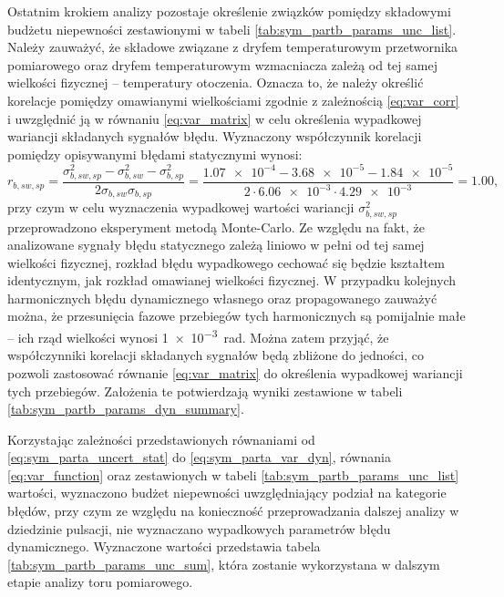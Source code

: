 Ostatnim krokiem analizy pozostaje określenie związków pomiędzy składowymi budżetu niepewności zestawionymi w tabeli \ref{tab:sym_partb_params_unc_list}. Należy zauważyć, że składowe związane z dryfem temperaturowym przetwornika pomiarowego oraz dryfem temperaturowym wzmacniacza zależą od tej samej wielkości fizycznej -- temperatury otoczenia. Oznacza to, że należy określić korelacje pomiędzy omawianymi wielkościami zgodnie z zależnością \eqref{eq:var_corr} i uwzględnić ją w równaniu \eqref{eq:var_matrix} w celu określenia wypadkowej wariancji składanych sygnałów błędu. Wyznaczony współczynnik korelacji pomiędzy opisywanymi błędami statycznymi wynosi:
\begin{equation}
r_{b,sw,sp} = \frac{\sigma_{b,sw,sp}^{2} - \sigma_{b,sw}^{2} - \sigma_{b,sp}^{2}}{2 \sigma_{b,sw} \sigma_{b,sp}} = \frac{\num{1.07e-4} - \num{3.68e-5} - \num{1.84e-5}}{2 \cdot \num{6.06e-3} \cdot \num{4.29e-3}} = 1.00 \label{eq:sym_partb_stat_corr},
\end{equation}
przy czym w celu wyznaczenia wypadkowej wartości wariancji $\sigma_{b,sw,sp}^{2}$ przeprowadzono eksperyment metodą Monte-Carlo. Ze względu na fakt, że analizowane sygnały błędu statycznego zależą liniowo w pełni od tej samej wielkości fizycznej, rozkład błędu wypadkowego cechować się będzie kształtem identycznym, jak rozkład omawianej wielkości fizycznej. W przypadku kolejnych harmonicznych błędu dynamicznego własnego oraz propagowanego zauważyć można, że przesunięcia fazowe przebiegów tych harmonicznych są pomijalnie małe -- ich rząd wielkości wynosi \qty{1e-3}{rad}. Można zatem przyjąć, że współczynniki korelacji składanych sygnałów będą zbliżone do jedności, co pozwoli zastosować równanie \eqref{eq:var_matrix} do określenia wypadkowej wariancji tych przebiegów. Założenia te potwierdzają wyniki zestawione w tabeli \ref{tab:sym_partb_params_dyn_summary}.

Korzystając zależności przedstawionych równaniami od \eqref{eq:sym_parta_uncert_stat} do \eqref{eq:sym_parta_var_dyn}, równania \eqref{eq:var_function} oraz zestawionych w tabeli \ref{tab:sym_partb_params_unc_list} wartości, wyznaczono budżet niepewności uwzględniający podział na kategorie błędów, przy czym ze względu na konieczność przeprowadzania dalszej analizy w dziedzinie pulsacji, nie wyznaczano wypadkowych parametrów błędu dynamicznego. Wyznaczone wartości przedstawia tabela \ref{tab:sym_partb_params_unc_sum}, która zostanie wykorzystana w dalszym etapie analizy toru pomiarowego.


